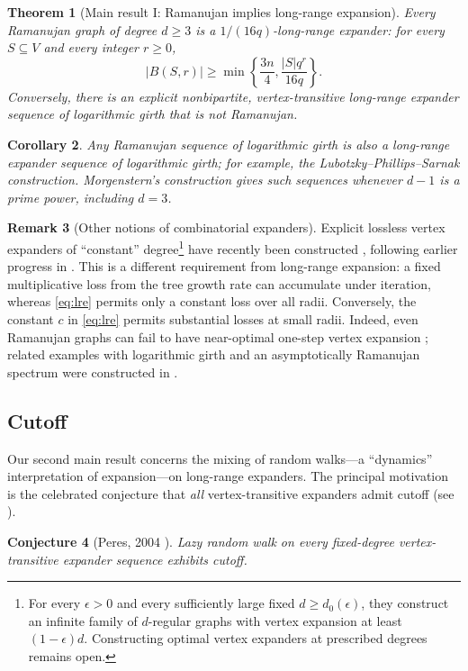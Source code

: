 \documentclass[11pt,reqno]{amsart}
\newtheorem{theorem}{Theorem}[section]
\newtheorem{corollary}[theorem]{Corollary}
\newtheorem{conjecture}[theorem]{Conjecture}
\theoremstyle{definition}
\newtheorem{remark}[theorem]{Remark}
\begin{document}
\begin{theorem}[Main result I: Ramanujan implies long-range expansion]
\label{thm:construction}
Every Ramanujan graph of degree $d\ge3$ is a $1/(16q)$-long-range expander: for every $S \subseteq V$ and every integer $r\ge0$,
\begin{equation}\label{eq:growth}
 |B(S,r)|
 \ge
 \min\left\{\frac{3n}{4},\frac{|S|q^r}{16q}\right\}.
\end{equation}
Conversely, there is an explicit nonbipartite, vertex-transitive
long-range expander sequence of logarithmic girth that is not Ramanujan. 
\end{theorem}

\begin{corollary}
    Any Ramanujan sequence of logarithmic girth is also a long-range expander sequence of logarithmic girth; for example, the Lubotzky--Phillips--Sarnak \cite{LPS} construction.
Morgenstern's construction \cite{Mor94} gives such sequences whenever
$d-1$ is a prime power, including $d=3$.
\end{corollary}

\begin{remark}[Other notions of combinatorial expanders]
Explicit lossless vertex expanders of ``constant'' degree\footnote{
For every $\epsilon>0$ and every sufficiently large fixed $d\ge d_0(\epsilon)$, they construct an infinite family of $d$-regular graphs with vertex expansion at least $(1-\epsilon)d$. Constructing optimal vertex expanders at prescribed degrees remains open.} have recently been
constructed \cite{HLMRZ}, following earlier progress in \cite{HLMOZ}. This is a different requirement from
long-range expansion: a fixed multiplicative loss from the tree growth
rate can accumulate under iteration, whereas \eqref{eq:lre} permits only
a constant loss over all radii. Conversely, the constant $c$ in \eqref{eq:lre} permits
substantial losses at small radii. Indeed, even Ramanujan graphs can fail to have
near-optimal one-step vertex expansion \cite{KK22}; related examples with
logarithmic girth and an asymptotically Ramanujan spectrum were
constructed in \cite{MM20}.
\end{remark}


\subsection{Cutoff}
Our second main result concerns the mixing of random walks---a ``dynamics'' interpretation of expansion---on long-range expanders. The principal
motivation is the celebrated conjecture that \textit{all} vertex-transitive expanders admit cutoff (see \cite[Section~1.1]{LP}). 
\begin{conjecture}[Peres, 2004 \cite{AIMMixingTimes}]\label{conj:transitive}
    Lazy random walk on every fixed-degree vertex-transitive
    expander sequence exhibits cutoff. 
\end{conjecture}
\end{document}
